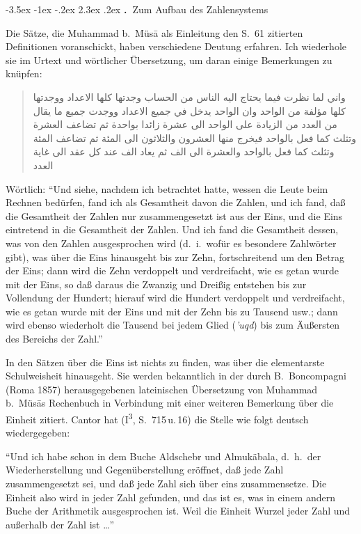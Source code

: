 \documentclass[11pt,a4paper]{article}
\makeatletter
\newcommand{\RL}[1]{\beginR#1\endR}
\renewcommand{\section}{\@startsection{section}{1}{\z@}%
  {-3.5ex \@plus -1ex \@minus -.2ex}%
  {2.3ex \@plus .2ex}%
  {\normalfont\Large\bfseries\color{sectioncolor}\thesection.\ }}
\newcommand{\ar}[1]{{\arabicfont\RL{#1}}}
\newcommand{\enquote}[1]{``#1''}
\makeatother
\begin{document}
\section{Zum Aufbau des Zahlensystems}

Die S\"atze, die Muhammad b.\ M\"us\=a als Einleitung den S.\ 61 zitierten Definitionen voranschickt, haben verschiedene Deutung erfahren. Ich wiederhole sie im Urtext und w\"ortlicher \"Ubersetzung, um daran einige Bemerkungen zu kn\"upfen:

\begin{quote}
\ar{واني لما نظرت فيما يحتاج اليه الناس من الحساب وجدتها كلها الاعداد ووجدتها كلها مؤلفة من الواحد وان الواحد يدخل في جميع الاعداد ووجدت جميع ما يقال من العدد من الزيادة على الواحد الى عشرة زائدا بواحدة ثم تضاعف العشرة وتثلث كما فعل بالواحد فيخرج منها العشرون والثلاثون الى المئة ثم تضاعف المئة وتثلث كما فعل بالواحد والعشرة الى الف ثم يعاد الف عند كل عقد الى غاية العدد}
\end{quote}

W\"ortlich: \enquote{Und siehe, nachdem ich betrachtet hatte, wessen die Leute beim Rechnen bed\"urfen, fand ich als Gesamtheit davon die Zahlen, und ich fand, da\ss{} die Gesamtheit der Zahlen nur zusammengesetzt ist aus der Eins, und die Eins eintretend in die Gesamtheit der Zahlen. Und ich fand die Gesamtheit dessen, was von den Zahlen ausgesprochen wird (d.\ i.\ wof\"ur es besondere Zahlw\"orter gibt), was \"uber die Eins hinausgeht bis zur Zehn, fortschreitend um den Betrag der Eins; dann wird die Zehn verdoppelt und verdreifacht, wie es getan wurde mit der Eins, so da\ss{} daraus die Zwanzig und Drei\ss{}ig entstehen bis zur Vollendung der Hundert; hierauf wird die Hundert verdoppelt und verdreifacht, wie es getan wurde mit der Eins und mit der Zehn bis zu Tausend usw.; dann wird ebenso wiederholt die Tausend bei jedem Glied (\textit{'uqd}) bis zum \"Au\ss{}ersten des Bereichs der Zahl.}

In den S\"atzen \"uber die Eins ist nichts zu finden, was \"uber die elementarste Schulweisheit hinausgeht. Sie werden bekanntlich in der durch B.\ Boncompagni (Roma 1857) herausgegebenen lateinischen \"Ubersetzung von Muhammad b.\ M\"us\=as Rechenbuch in Verbindung mit einer weiteren Bemerkung \"uber die Einheit zitiert. Cantor hat (I\textsuperscript{3}, S.\ 715\,u.\,16) die Stelle wie folgt deutsch wiedergegeben:

\enquote{Und ich habe schon in dem Buche Aldschebr und Almuk\"abala, d.\ h.\ der Wiederherstellung und Gegen\"uberstellung er\"offnet, da\ss{} jede Zahl zusammengesetzt sei, und da\ss{} jede Zahl sich \"uber eins zusammensetze. Die Einheit also wird in jeder Zahl gefunden, und das ist es, was in einem andern Buche der Arithmetik ausgesprochen ist. Weil die Einheit Wurzel jeder Zahl und au\ss{}erhalb der Zahl ist \ldots{}}
\end{document}
